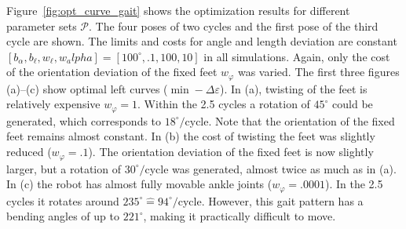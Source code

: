 \documentclass[10pt,a4paper]{article}
\begin{document}

Figure~\ref{fig:opt_curve_gait} shows the optimization results for different parameter sets $\mathcal{P}$.
The four poses of two cycles and the first pose of the third cycle are shown.
The limits and costs for angle and length deviation are constant $[b_\alpha, b_\ell, w_\ell, w_alpha] =[100^\circ, .1, 100, 10]$ in all simulations.
Again, only the cost of the orientation deviation of the fixed feet $w_\varphi$ was varied.
The first three figures (a)--(c) show optimal left curves ($\min -\Delta \varepsilon$).
In (a), twisting of the feet is relatively expensive $w_\varphi=1$.
Within the 2.5 cycles a rotation of $45^\circ$ could be generated, which corresponds to $18^\circ/$cycle.
Note that the orientation of the fixed feet remains almost constant.
In (b) the cost of twisting the feet was slightly reduced ($w_\varphi=.1$).
The orientation deviation of the fixed feet is now slightly larger, but a rotation of $30^\circ/$cycle was generated, almost twice as much as in (a).
In (c) the robot has almost fully movable ankle joints ($w_\varphi=.0001$).
In the 2.5 cycles it rotates around $235^\circ \hat{=} 94^\circ/$cycle.
However, this gait pattern has a bending angles of up to $221^\circ$, making it practically difficult to move.
\end{document}
